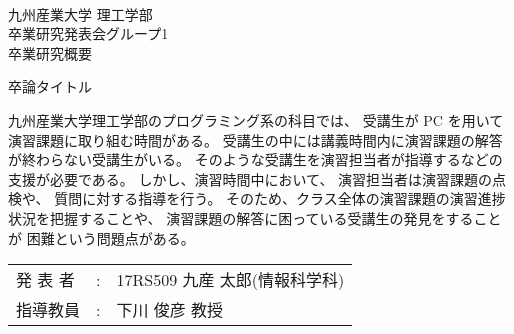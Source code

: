 \documentclass[a4j,12pt]{jsarticle}
\title
\renewcommand{\author}[1]{\def\author{#1}}
\renewcommand{\title}[1]{\def\title{#1}}
\newcommand{\supervisor}[1]{\def\supervisor{#1}}
\newcommand{\group}[1]{\def\group{#1}}
\newcommand{\makeheader}{
\newpage
\noindent\\九州産業大学 理工学部
\noindent\\卒業研究発表会グループ\group
\noindent\\卒業研究概要
\vskip 20mm
\begin{center}
  \title 
\end{center}
\vskip 15mm
}
\newcommand{\maketailer}{
\vskip 20mm
\begin{center}
\setlength{\tabcolsep}{1mm}
\begin{tabular}[h]{p{4zw}p{1em}l}
 発 表 者&:& \author (情報科学科)\\
 指導教員&:& \supervisor
\end{tabular}
\end{center}
}
\newenvironment{rsabst}{\makeheader}{\maketailer}
\begin{document}
\title{卒論タイトル}
\author{17RS509 九産 太郎}
\supervisor{下川 俊彦 教授}
\group{1}

\begin{rsabst}

九州産業大学理工学部のプログラミング系の科目では、
受講生が PC を用いて演習課題に取り組む時間がある。
受講生の中には講義時間内に演習課題の解答が終わらない受講生がいる。
そのような受講生を演習担当者が指導するなどの支援が必要である。
しかし、演習時間中において、
演習担当者は演習課題の点検や、
質問に対する指導を行う。
そのため、クラス全体の演習課題の演習進捗状況を把握することや、
演習課題の解答に困っている受講生の発見をすることが
困難という問題点がある。


\end{rsabst}
\end{document}
